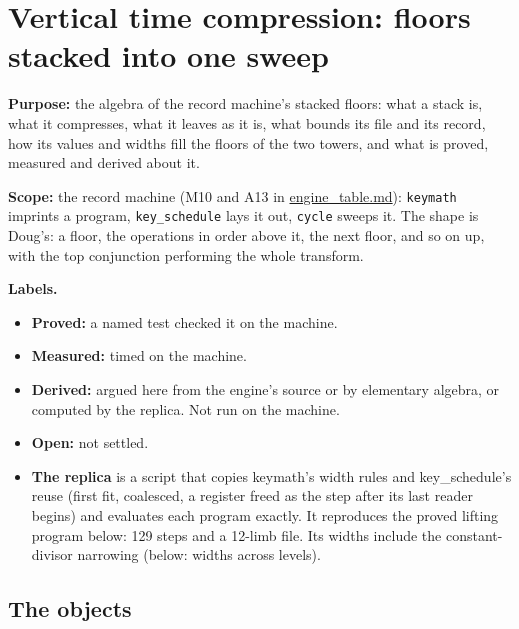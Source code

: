 \chapter{\texorpdfstring{Vertical time compression: floors stacked into one sweep}{Vertical time compression: floors stacked into one sweep}}
\label{chap:vertical-time-compression}

\textbf{Purpose:} the algebra of the record machine's stacked floors: what a stack is, what it compresses, what it leaves as it is, what bounds its file and its record, how its values and widths fill the floors of the two towers, and what is proved, measured and derived about it.

\textbf{Scope:} the record machine (M10 and A13 in \hyperref[chap:engine-table]{engine\_\allowbreak{}table.md}): \texttt{keymath} imprints a program, \texttt{key\_\allowbreak{}schedule} lays it out, \texttt{cycle} sweeps it. The shape is Doug's: a floor, the operations in order above it, the next floor, and so on up, with the top conjunction performing the whole transform.

\textbf{Labels.}

\begin{itemize}
\item \textbf{Proved:} a named test checked it on the machine.
\item \textbf{Measured:} timed on the machine.
\item \textbf{Derived:} argued here from the engine's source or by elementary algebra, or computed by the replica. Not run on the machine.
\item \textbf{Open:} not settled.
\item \textbf{The replica} is a script that copies keymath's width rules and key\_\allowbreak{}schedule's reuse (first fit, coalesced, a register freed as the step after its last reader begins) and evaluates each program exactly. It reproduces the proved lifting program below: 129 steps and a 12-limb file. Its widths include the constant-divisor narrowing (below: widths across levels).
\end{itemize}

\section{\texorpdfstring{The objects}{The objects}}

